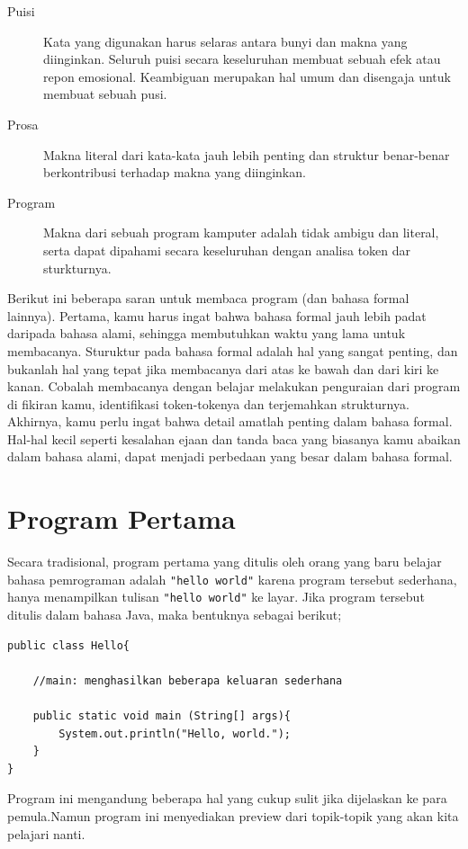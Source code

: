 \begin{description}
	\item[Puisi] Kata yang digunakan harus selaras antara bunyi dan makna  yang diinginkan. Seluruh puisi secara keseluruhan membuat sebuah efek atau repon emosional. Keambiguan merupakan hal umum dan disengaja untuk membuat sebuah pusi.
	\item[Prosa] Makna literal dari kata-kata jauh lebih penting dan struktur benar-benar berkontribusi terhadap makna yang diinginkan.
	\item[Program] Makna dari sebuah program kamputer adalah tidak ambigu dan literal, serta dapat dipahami secara keseluruhan dengan analisa token dar sturkturnya.
\end{description}

Berikut ini beberapa saran untuk membaca program (dan bahasa formal lainnya). Pertama, kamu harus ingat bahwa bahasa formal jauh lebih padat daripada bahasa alami, sehingga membutuhkan waktu yang lama untuk membacanya. Sturuktur pada bahasa formal adalah hal yang sangat penting, dan bukanlah hal yang tepat jika membacanya dari atas ke bawah dan dari kiri ke kanan. Cobalah membacanya dengan belajar melakukan penguraian dari program di fikiran kamu, identifikasi token-tokenya dan terjemahkan strukturnya. Akhirnya, kamu perlu ingat bahwa detail amatlah penting dalam bahasa formal. Hal-hal kecil seperti kesalahan ejaan dan tanda baca yang biasanya kamu abaikan dalam bahasa alami, dapat menjadi perbedaan yang besar dalam bahasa formal.

\section{Program Pertama}
Secara tradisional, program pertama yang ditulis oleh orang yang baru belajar bahasa pemrograman adalah \texttt{"hello world"} karena program tersebut sederhana, hanya menampilkan tulisan \texttt{"hello world"} ke layar. Jika program tersebut ditulis dalam bahasa Java, maka bentuknya sebagai berikut;
\begin{lstlisting}
public class Hello{

	//main: menghasilkan beberapa keluaran sederhana
	
	public static void main (String[] args){
		System.out.println("Hello, world.");	
	}
}

\end{lstlisting}

Program ini mengandung beberapa hal yang cukup sulit jika dijelaskan ke para pemula.Namun program ini menyediakan preview dari topik-topik yang akan kita pelajari nanti.


